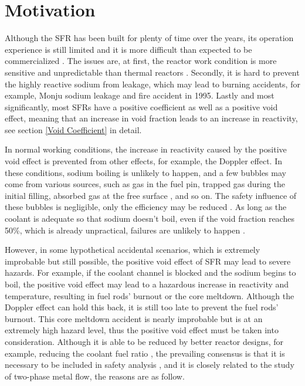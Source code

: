 \documentclass{article}
\begin{document}
\section{Motivation}
\label{motivation}
Although the SFR has been built for plenty of time over the years, its operation experience is still limited and it is more difficult than expected to be commercialized \cite{chengSafetySodiumCooledFast2021}. The issues are, at first, %
the reactor work condition is more sensitive and unpredictable than thermal reactors \cite{zohuriThermodynamicsNuclearPower2019}. Secondly, it is hard to prevent the highly reactive sodium from leakage, which may lead to burning accidents, for example, Monju sodium leakage and fire accident in 1995. Lastly and most significantly, most SFRs have a positive coefficient as well as a positive void effect, meaning that an increase in void fraction leads to an increase in reactivity, see section \ref{Void Coefficient} in detail.

In normal working conditions, the increase in reactivity caused by the positive void effect is prevented from other effects, for example, the Doppler effect. %
In these conditions, sodium boiling is unlikely to happen, and a few bubbles may come from various sources, such as gas in the fuel pin, trapped gas during the initial filling, absorbed gas at the free surface \cite{parsegianSeriesMonographsTextbooks}, and so on. The safety influence of these bubbles is negligible, only the efficiency may be reduced \cite{bieberle3DShapeVelocity2024}. As long as the coolant is adequate so that sodium doesn't boil, even if the void fraction reaches 50\%, which is already unpractical, failures are unlikely to happen \cite{parsegianSeriesMonographsTextbooks}.

However, in some hypothetical accidental scenarios, which is extremely improbable but still possible, the positive void effect of SFR may lead to severe hazards. For example, if the coolant channel is blocked and the sodium begins to boil, the positive void effect may lead to a hazardous increase in reactivity and temperature, resulting in fuel rods' burnout or the core meltdown. Although the Doppler effect can hold this back, it is still too late to prevent the fuel rods' burnout. This core meltdown accident is nearly improbable but is at an extremely high hazard level, thus the positive void effect must be taken into consideration. \cite{chengSafetySodiumCooledFast2021, parsegianSeriesMonographsTextbooks, schulenbergFourthGenerationNuclear2022} Although it is able to be reduced by better reactor designs, for example, reducing the coolant fuel ratio \cite{tommasiValidationSodiumVoid2010}, the prevailing consensus is that it is necessary to be included in safety analysis \cite{radmanDevelopmentNovelTwophase2021}, and it is closely related to the study of two-phase metal flow, the reasons are as follow.
\end{document}
